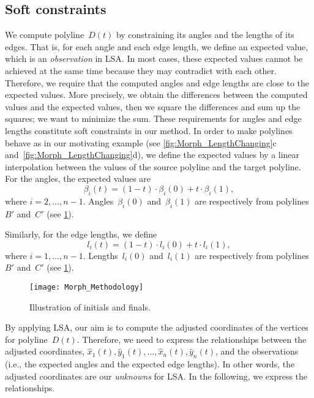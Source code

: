 \subsection{Soft constraints}
\label{sec:Morph_SoftConstraints}
We compute polyline~$D(t)$ by constraining its 
angles and the lengths of its edges. 
That is, for each angle and each edge length, 
we define an expected value, 
which is an \emph{observation} in LSA. 
In most cases, 
these expected values cannot be achieved at the same time 
because they may contradict with each other. 
Therefore, we require that
the computed angles and edge lengths 
are close to the expected values. 
More precisely, we obtain the differences 
between the computed values and the expected values,
then we square the differences and sum up the squares;
we want to minimize the sum.
These requirements for angles and edge lengths 
constitute soft constraints in our method.
In order to make polylines behave as in our motivating example 
(see \figs\ref{fig:Morph_LengthChanging}c 
and~\ref{fig:Morph_LengthChanging}d), 
we define the expected values by a linear interpolation 
between the values of 
the source polyline and the target polyline. 
For the angles, the expected values are
\begin{equation}
\label{eq:Morph_AngleConstraints}
\beta_i(t)=(1-t)\cdot \beta_i(0) + t\cdot\beta_i(1),
\end{equation}
where $i=2,\ldots,n-1$.
Angles~$\beta_i (0)$ and~$\beta_i (1)$ 
are respectively from polylines~$B'$ and~$C'$ 
(see \fig\ref{fig:Morph_InitialsFinals}).

Similarly, for the edge lengths, we define
\begin{equation}
\label{eq:Morph_LengthConstraints}
l_i(t)=(1-t) \cdot l_i(0)+t\cdot l_i(1),
\end{equation}
where $i=1,\ldots,n-1$.
Lengths~$l_i(0)$ and~$l_i(1)$
are respectively from polylines~$B'$ and~$C'$ 
(see \fig\ref{fig:Morph_InitialsFinals}).

\begin{figure}[tb]
	\centering	
	\texttt{[image: Morph\_Methodology]}
	\caption{Illustration of initials and finals.}
	\label{fig:Morph_InitialsFinals}
\end{figure}

By applying LSA, our aim is to compute the adjusted coordinates
of the vertices for polyline~$D(t)$.
Therefore, we need to express 
the relationships between the adjusted coordinates,
$\hat{x}_{1}(t),\hat{y}_{1}(t), \ldots,
\hat{x}_{n}(t),\hat{y}_{n}(t)$,
and the observations 
(i.e., the expected angles and the expected edge lengths).
In other words, the adjusted coordinates 
are our \emph{unknowns} for LSA.
In the following, we express the relationships.

